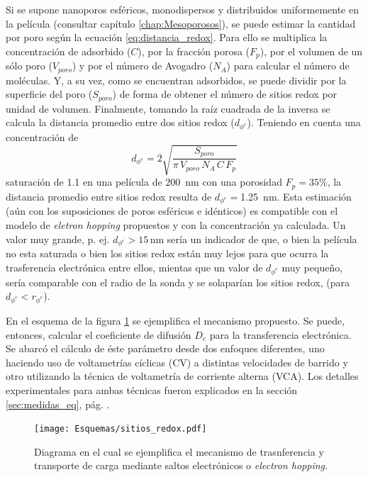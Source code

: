	 	 Si se supone nanoporos esféricos, monodispersos y distribuidos uniformemente en la película (consultar capítulo \ref{chap:Mesoporosos}), se puede estimar la cantidad \ru\space por poro según la ecuación \ref{eq:distancia_redox}. Para ello se multiplica la concentración de \ru\space adsorbido ($C$), por la fracción porosa ($F_p$), por el volumen de un sólo poro ($V_{poro}$) y por el número de Avogadro ($N_{A}$) para calcular el número de moléculas. Y, a su vez, como se encuentran adsorbidos, se puede dividir por la superficie del poro ($S_{poro}$) de forma de obtener el número de sitios redox por unidad de volumen. Finalmente, tomando la raíz cuadrada de la inversa se calcula la distancia promedio entre dos sitios redox ($d_{\phi^{e}}$). Teniendo en cuenta una concentración de \linebreak
	 		\begin{equation}
					d_{\phi^{e}}=2\sqrt{\frac{S_{poro}}{\pi\, V_{poro}\, N_A\, C\, F_p}}
					\label{eq:distancia_redox}
			\end{equation}
	     saturación de \SI{1,1}{\Molar} en una película de \SI{200}{nm} con una porosidad $F_p=35\%$, la distancia promedio entre sitios redox resulta de $d_{\phi^{e}}=$\SI{1.25}{nm}. Esta estimación (aún con los suposiciones de poros esféricos e idénticos) es compatible con el modelo de \textit{eletron hopping} propuestos y con la concentración ya calculada. Un valor muy grande, p. ej. $d_{\phi^{e}}>15\, \text{nm}$ sería un indicador de que, o bien la película no esta saturada o bien los sitios redox están muy lejos para que ocurra la trasferencia electrónica entre ellos, mientas que un valor de $d_{\phi^{e}}$ muy pequeño, sería comparable con el radio de la sonda y se solaparían los sitios redox, (para $d_{\phi^{e}} < r_{\phi^{e}}$). 
	
	     En el esquema de la figura \ref{fig:sitios_redox} se ejemplifica el mecanismo propuesto. Se puede, entonces, calcular el coeficiente de difusión $D_e$ para la transferencia electrónica. Se abarcó el cálculo de éste parámetro desde dos enfoques diferentes, uno haciendo uso de voltametrías cíclicas (CV) a distintas velocidades de barrido y otro utilizando la técnica de voltametría de corriente alterna (VCA). Los detalles experimentales para ambas técnicas fueron explicados en la sección \ref{sec:medidas_eq}, pág. \pageref{sec:medidas_eq}.
			\begin{figure}[ht!]
					\centering
			 	    \texttt{[image: Esquemas/sitios\_redox.pdf]}
			        \caption[Mecanismo de transferencia de electrones]{Diagrama en el cual se ejemplifica el mecanismo de trasnferencia y transporte de carga mediante saltos electrónicos o \textit{electron hopping.}}
			        \label{fig:sitios_redox}
			      	\end{figure} 

